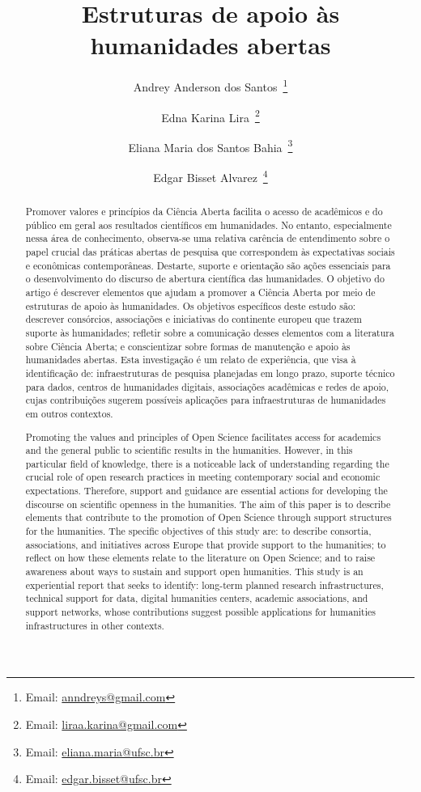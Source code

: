 \documentclass[portuguese]{textolivre}
\title{Estruturas de apoio às humanidades abertas}
\author[1]{Andrey Anderson dos Santos~\orcid{0000-0001-8399-0035}\thanks{Email: \href{mailto:anndreys@gmail.com}{anndreys@gmail.com}}}
\author[1]{Edna Karina Lira~\orcid{0000-0001-5543-3792}\thanks{Email: \href{mailto:liraa.karina@gmail.com}{liraa.karina@gmail.com}}}
\author[1]{Eliana Maria dos Santos Bahia~\orcid{0000-0003-4037-3189}\thanks{Email: \href{mailto:eliana.maria@ufsc.br}{eliana.maria@ufsc.br}}}
\author[1]{Edgar Bisset Alvarez~\orcid{0000-0002-5388-5944}\thanks{Email: \href{mailto:edgar.bisset@ufsc.br}{edgar.bisset@ufsc.br}}}
\affil[1]{Universidade Federal de Santa Catarina, Programa de Pós-graduação em Ciência da Informação, Florianópolis, SC, Brasil.}
\begin{document}
\maketitle
\begin{polyabstract}
\begin{abstract}
Promover valores e princípios da Ciência Aberta facilita o acesso de acadêmicos e do público em geral aos resultados científicos em humanidades. No entanto, especialmente nessa área de conhecimento, observa-se uma relativa carência de entendimento sobre o papel crucial das práticas abertas de pesquisa que correspondem às expectativas sociais e econômicas contemporâneas. Destarte, suporte e orientação são ações essenciais para o desenvolvimento do discurso de abertura científica das humanidades. O objetivo do artigo é descrever elementos que ajudam a promover a Ciência Aberta por meio de estruturas de apoio às humanidades. Os objetivos específicos deste estudo são: descrever consórcios, associações e iniciativas do continente europeu que trazem suporte às humanidades; refletir sobre a comunicação desses elementos com a literatura sobre Ciência Aberta; e conscientizar sobre formas de manutenção e apoio às humanidades abertas. Esta investigação é um relato de experiência, que visa à identificação de: infraestruturas de pesquisa planejadas em longo prazo, suporte técnico para dados, centros de humanidades digitais, associações acadêmicas e redes de apoio, cujas contribuições sugerem possíveis aplicações para infraestruturas de humanidades em outros contextos.

\end{abstract}

\begin{english}
\begin{abstract}
Promoting the values and principles of Open Science facilitates access for academics and the general public to scientific results in the humanities. However, in this particular field of knowledge, there is a noticeable lack of understanding regarding the crucial role of open research practices in meeting contemporary social and economic expectations. Therefore, support and guidance are essential actions for developing the discourse on scientific openness in the humanities. The aim of this paper is to describe elements that contribute to the promotion of Open Science through support structures for the humanities. The specific objectives of this study are: to describe consortia, associations, and initiatives across Europe that provide support to the humanities; to reflect on how these elements relate to the literature on Open Science; and to raise awareness about ways to sustain and support open humanities. This study is an experiential report that seeks to identify: long-term planned research infrastructures, technical support for data, digital humanities centers, academic associations, and support networks, whose contributions suggest possible applications for humanities infrastructures in other contexts.


\end{abstract}
\end{english}
\end{polyabstract}
\end{document}
